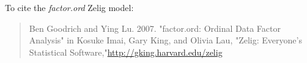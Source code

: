 To cite the \emph{ factor.ord } Zelig model:
 \begin{verse}
 Ben Goodrich and Ying Lu. 2007. "factor.ord: Ordinal Data Factor Analysis" in Kosuke Imai, Gary King, and Olivia Lau, "Zelig: Everyone's Statistical Software,"\url{http://gking.harvard.edu/zelig} 
\end{verse}